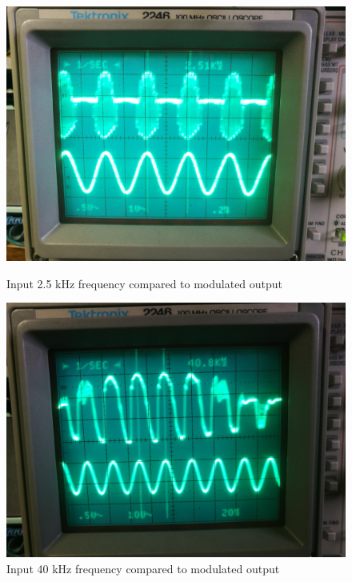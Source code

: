 \begin{figure}[ht!]
\centering

    \begin{minipage}{0.49\textwidth}
    \centering
    \includegraphics[width= \textwidth]{Figures/Implementation/Mixer/infreq.jpg}
    \caption{Input 2.5 kHz frequency compared to modulated output}
    \label{fig:mix2.5kinputVsOut}
    \end{minipage}\hfill
    \begin{minipage}{0.49\textwidth}
    \centering
    \includegraphics[width= \textwidth]{Figures/Implementation/Mixer/outfreq.jpg}
    \caption{Input 40 kHz frequency compared to modulated output}
    \label{fig:mix40kinputVsOut}
    \end{minipage}
    
\end{figure}

